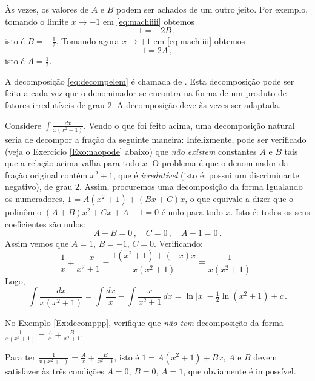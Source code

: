 \begin{obs}
Às vezes, os 
valores de $A$ e $B$ podem ser achados de um outro jeito. Por exemplo,
tomando o limite $x\to -1$ em \eqref{eq:machiiii} obtemos
$$1=-2B\,,$$
isto é $B=-\frac12$. Tomando agora $x\to +1$ em \eqref{eq:machiiii} obtemos 
$$1=2A\,,$$ isto é $A=\tfrac12$. 
\end{obs}

A decomposição \eqref{eq:decompelem} é chamada de . 
Esta decomposição pode ser feita a cada vez que o
denominador se encontra na forma de um produto de fatores irredutíveis de
grau $2$. A decomposição deve às vezes ser adaptada. 

\begin{ex}\label{Ex:decomppp}
Considere $\int\frac{dx}{x(x^2+1)}$. 
Vendo o que foi feito acima, uma 
decomposição natural seria de decompor a fração da seguinte maneira:
Infelizmente, pode ser verificado (veja o Exercício \ref{Exo:naopode} abaixo) que \emph{não existem} constantes $A$
e $B$ tais que a relação acima valha para todo $x$. O problema é que o denominador da fração original
contém $x^2+1$, que é \emph{irredutível} (isto é: possui um discriminante
negativo), de grau $2$. Assim, procuremos uma decomposição da forma
Igualando os numeradores,
$1=A(x^2+1)+(Bx+C)x$, o que equivale a dizer que o polinômio $(A+B)x^2+Cx+A-1=0$
é nulo para todo $x$. Isto é: todos os seus coeficientes são nulos:
$$
A+B=0\,,\quad C=0 \,,\quad A-1=0\,.$$
Assim vemos que $A=1$, $B=-1$, $C=0$.
Verificando:
$$
\frac{1}{x}+\frac{-x}{x^2+1}=\frac{1(x^2+1)+(-x)x}{x(x^2+1)}
\equiv \frac{1}{x(x^2+1)}\,.
$$
Logo,
$$\int\frac{dx}{x(x^2+1)}=\int\frac{dx}{x}-\int \frac{x}{x^2+1}\,dx
=\ln |x|-\tfrac12\ln(x^2+1)+c\,.
$$
\end{ex}


\begin{exo}\label{Exo:naopode}
No Exemplo \ref{Ex:decomppp}, verifique que \emph{não tem}
decomposição da forma 
$\frac{1}{x(x^2+1)}=\frac{A}{x}+\frac{B}{x^2+1}$.
\begin{sol}
Para ter $\frac{1}{x(x^2+1)}=\frac{A}{x}+\frac{B}{x^2+1}$, isto é
$1=A(x^2+1)+Bx$, $A$ e $B$
devem satisfazer às três condições $A=0$, $B=0$, $A=1$, que obviamente é
impossível.
\end{sol}

\end{exo}

